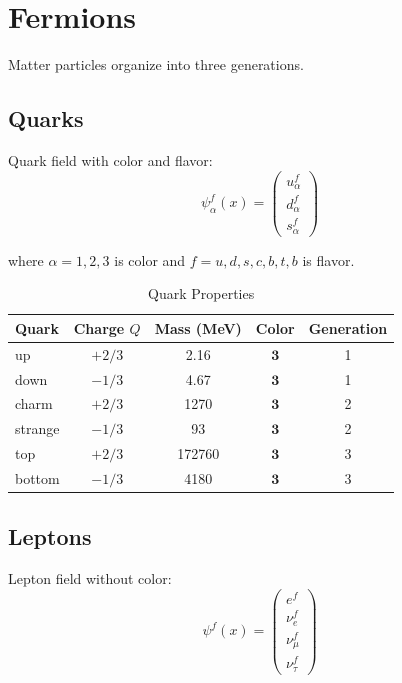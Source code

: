 \section{Fermions}

Matter particles organize into three generations.

\subsection{Quarks}

\begin{definition}
\label{def:quark}
Quark field with color and flavor:
\begin{equation}
\psi_{\alpha}^f(x) = \begin{pmatrix}u_\alpha^f \\ d_\alpha^f \\ s_\alpha^f\end{pmatrix}
\end{equation}

where $\alpha = 1,2,3$ is color and $f = u,d,s,c,b,t,b$ is flavor.
\end{definition}

\begin{table}[h]
\centering
\caption{Quark Properties}
\begin{tabular}{lcccc}
\toprule
Quark & Charge $Q$ & Mass (MeV) & Color & Generation \\
\midrule
up & $+2/3$ & 2.16 & $\mathbf{3}$ & 1 \\
down & $-1/3$ & 4.67 & $\mathbf{3}$ & 1 \\
charm & $+2/3$ & 1270 & $\mathbf{3}$ & 2 \\
strange & $-1/3$ & 93 & $\mathbf{3}$ & 2 \\
top & $+2/3$ & 172760 & $\mathbf{3}$ & 3 \\
bottom & $-1/3$ & 4180 & $\mathbf{3}$ & 3 \\
\bottomrule
\end{tabular}
\end{table}

\subsection{Leptons}

\begin{definition}
\label{def:lepton}
Lepton field without color:
\begin{equation}
\psi^f(x) = \begin{pmatrix}e^f \\ \nu_e^f \\ \nu_\mu^f \\ \nu_\tau^f\end{pmatrix}
\end{equation}
\end{definition}

